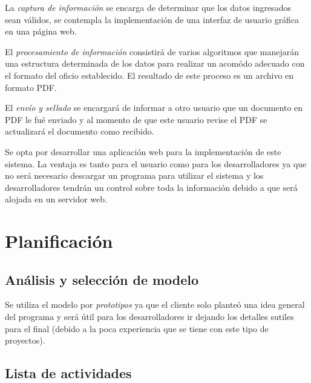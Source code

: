 \documentclass[letterpaper]{article}
\begin{document}
La \emph{captura de información} se encarga de determinar que los datos ingresados sean válidos, se contempla la implementación de una interfaz de usuario gráfica en una página web.

El \emph{procesamiento de información} consistirá de varios algoritmos que manejarán una estructura determinada de los datos para realizar un acomódo adecuado con el formato del oficio establecido. El resultado de este proceso es un archivo en formato PDF.

El \emph{envío y sellado} se encargará de informar a otro usuario que un documento en PDF le fué enviado y al momento de que este usuario revise el PDF se actualizará el documento como recibido.

Se opta por desarrollar una aplicación web para la implementación de este sistema. La ventaja es tanto para el usuario como para los desarrolladores ya que no será necesario descargar un programa para utilizar el sistema y los desarrolladores tendrán un control sobre toda la información debido a que será alojada en un servidor web.

\section{Planificación}

\subsection{Análisis y selección de modelo}
Se utiliza el modelo por \emph{prototipos} ya que el cliente solo planteó una idea general del programa y será útil para los desarrolladores ir dejando los detalles sutiles para el final (debido a la poca experiencia que se tiene con este tipo de proyectos).

\subsection{Lista de actividades}
\end{document}
